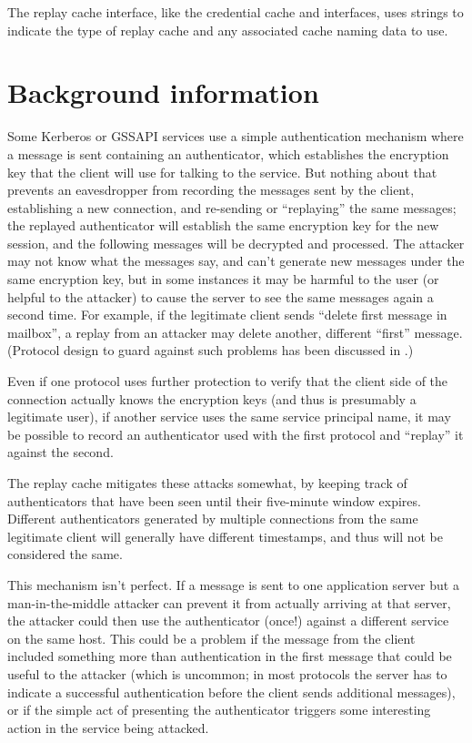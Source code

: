 \documentclass[letterpaper,10pt,english]{sphinxmanual}
\begin{document}
The replay cache interface, like the credential cache and
{\hyperref[\detokenize{basic/keytab_def:keytab-definition}]{}} interfaces, uses  strings to
indicate the type of replay cache and any associated cache naming
data to use.


\section{Background information}
\label{\detokenize{basic/rcache_def:background-information}}
Some Kerberos or GSSAPI services use a simple authentication mechanism
where a message is sent containing an authenticator, which establishes
the encryption key that the client will use for talking to the
service.  But nothing about that prevents an eavesdropper from
recording the messages sent by the client, establishing a new
connection, and re-sending or “replaying” the same messages; the
replayed authenticator will establish the same encryption key for the
new session, and the following messages will be decrypted and
processed.  The attacker may not know what the messages say, and can’t
generate new messages under the same encryption key, but in some
instances it may be harmful to the user (or helpful to the attacker)
to cause the server to see the same messages again a second time.  For
example, if the legitimate client sends “delete first message in
mailbox”, a replay from an attacker may delete another, different
“first” message.  (Protocol design to guard against such problems has
been discussed in .)

Even if one protocol uses further protection to verify that the client
side of the connection actually knows the encryption keys (and thus is
presumably a legitimate user), if another service uses the same
service principal name, it may be possible to record an authenticator
used with the first protocol and “replay” it against the second.

The replay cache mitigates these attacks somewhat, by keeping track of
authenticators that have been seen until their five-minute window
expires.  Different authenticators generated by multiple connections
from the same legitimate client will generally have different
timestamps, and thus will not be considered the same.

This mechanism isn’t perfect.  If a message is sent to one application
server but a man-in-the-middle attacker can prevent it from actually
arriving at that server, the attacker could then use the authenticator
(once!) against a different service on the same host.  This could be a
problem if the message from the client included something more than
authentication in the first message that could be useful to the
attacker (which is uncommon; in most protocols the server has to
indicate a successful authentication before the client sends
additional messages), or if the simple act of presenting the
authenticator triggers some interesting action in the service being
attacked.
\end{document}
